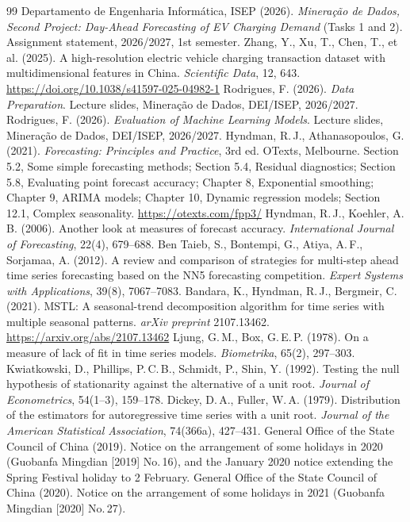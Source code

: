 \documentclass[12pt,a4paper,openany]{report}
\begin{document}
{}
\begin{thebibliography}{99}
 Departamento de Engenharia Informática, ISEP (2026). \emph{Mineração de Dados, Second Project:
  Day-Ahead Forecasting of EV Charging Demand} (Tasks 1 and 2). Assignment statement, 2026/2027, 1st semester.
 Zhang, Y., Xu, T., Chen, T., et al. (2025). A high-resolution electric vehicle
  charging transaction dataset with multidimensional features in China. \emph{Scientific Data}, 12, 643.
  \url{https://doi.org/10.1038/s41597-025-04982-1}
 Rodrigues, F. (2026). \emph{Data Preparation}. Lecture slides, Mineração de Dados, DEI/ISEP,
  2026/2027.
 Rodrigues, F. (2026). \emph{Evaluation of Machine Learning Models}. Lecture slides, Mineração
  de Dados, DEI/ISEP, 2026/2027.
 Hyndman, R.\,J., Athanasopoulos, G. (2021). \emph{Forecasting: Principles and Practice}, 3rd ed.
  OTexts, Melbourne. Section 5.2, Some simple forecasting methods; Section 5.4, Residual diagnostics; Section
  5.8, Evaluating point forecast accuracy; Chapter 8, Exponential smoothing; Chapter 9, ARIMA models; Chapter 10,
  Dynamic regression models; Section 12.1, Complex seasonality. \url{https://otexts.com/fpp3/}
 Hyndman, R.\,J., Koehler, A.\,B. (2006). Another look at measures of forecast accuracy.
  \emph{International Journal of Forecasting}, 22(4), 679--688.
 Ben Taieb, S., Bontempi, G., Atiya, A.\,F., Sorjamaa, A. (2012). A review and comparison
  of strategies for multi-step ahead time series forecasting based on the NN5 forecasting competition.
  \emph{Expert Systems with Applications}, 39(8), 7067--7083.
 Bandara, K., Hyndman, R.\,J., Bergmeir, C. (2021). MSTL: A seasonal-trend decomposition
  algorithm for time series with multiple seasonal patterns. \emph{arXiv preprint} 2107.13462.
  \url{https://arxiv.org/abs/2107.13462}
 Ljung, G.\,M., Box, G.\,E.\,P. (1978). On a measure of lack of fit in time series models.
  \emph{Biometrika}, 65(2), 297--303.
 Kwiatkowski, D., Phillips, P.\,C.\,B., Schmidt, P., Shin, Y. (1992). Testing the null
  hypothesis of stationarity against the alternative of a unit root. \emph{Journal of Econometrics}, 54(1--3),
  159--178.
 Dickey, D.\,A., Fuller, W.\,A. (1979). Distribution of the estimators for
  autoregressive time series with a unit root. \emph{Journal of the American Statistical Association}, 74(366a),
  427--431.
 General Office of the State Council of China (2019). Notice on the arrangement of some
  holidays in 2020 (Guobanfa Mingdian [2019] No.\,16), and the January 2020 notice extending the Spring Festival
  holiday to 2 February.
 General Office of the State Council of China (2020). Notice on the arrangement of some
  holidays in 2021 (Guobanfa Mingdian [2020] No.\,27).
\end{thebibliography}
\end{document}
